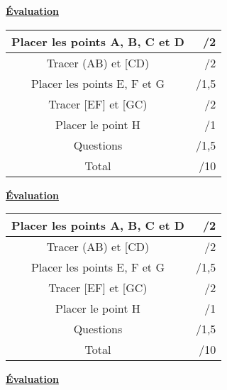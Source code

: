 \documentclass[a4paper,11pt]{article}
\begin{document}
\vspace*{0.5cm}

\textbf{\underline{Évaluation} }\\


\renewcommand{\arraystretch}{1.5} %
\setlength{\tabcolsep}{1.5cm} %

\begin{tabular}{|c|r|}
\hline 
Placer les points A, B, C et D &              /2 \\ 
\hline 
Tracer (AB) et [CD) & /2 \\ 
\hline 
Placer les points E, F et G & /1,5 \\ 
\hline 
Tracer [EF] et [GC) & /2 \\ 
\hline 
Placer le point H & /1 \\ 
\hline 
Questions  & /1,5 \\ 
\hline 
Total  & /10 \\ 
\hline 
\end{tabular} 

\vspace*{0.8cm}

\textbf{\underline{Évaluation} }\\


\renewcommand{\arraystretch}{1.5} %
\setlength{\tabcolsep}{1.5cm} %

\begin{tabular}{|c|r|}
\hline 
Placer les points A, B, C et D &              /2 \\ 
\hline 
Tracer (AB) et [CD) & /2 \\ 
\hline 
Placer les points E, F et G & /1,5 \\ 
\hline 
Tracer [EF] et [GC) & /2 \\ 
\hline 
Placer le point H & /1 \\ 
\hline 
Questions  & /1,5 \\ 
\hline 
Total  & /10 \\ 
\hline 
\end{tabular} 


\vspace*{0.8cm}

\textbf{\underline{Évaluation} }\\


\renewcommand{\arraystretch}{1.5} %
\setlength{\tabcolsep}{1.5cm} %
\end{document}
